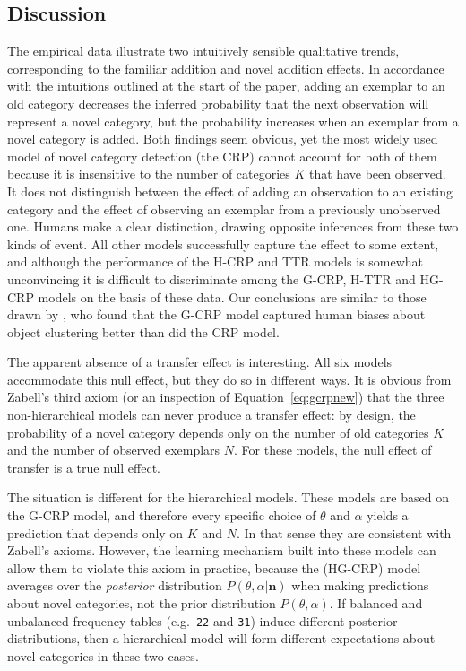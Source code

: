 \documentclass[doc]{apa6}
\newcommand{\dist}[1]{\texttt{#1}}
\begin{document}
\subsection{Discussion}

The empirical data illustrate two intuitively sensible qualitative trends, corresponding to the familiar addition and novel addition effects. In accordance with the intuitions outlined at the start of the paper, adding an exemplar to an old category decreases the inferred probability that the next observation will represent a novel category, but the probability increases when an exemplar from a novel category is added. Both findings seem obvious, yet the most widely used model of novel category detection (the CRP) cannot account for both of them because it is insensitive to the number of categories $K$ that have been observed. It does not distinguish between the effect of adding an observation to an existing category and the effect of observing an exemplar from a previously unobserved one. Humans make a clear distinction, drawing opposite inferences from these two kinds of event. All other models successfully capture the effect to some extent, and although the performance of the H-CRP and TTR models is somewhat unconvincing it is difficult to discriminate among the G-CRP, H-TTR and HG-CRP models on the basis of these data. Our conclusions are similar to those drawn by , who found that the G-CRP model captured human biases about object clustering better than did the CRP model.

The apparent absence of a transfer effect is interesting. All six models accommodate this null effect, but they do so in different ways. It is obvious from Zabell's third axiom (or an inspection of Equation~\ref{eq:gcrpnew}) that the three non-hierarchical models can never produce a transfer effect: by design, the probability of a novel category depends only on the number of old categories $K$ and the number of observed exemplars $N$. For these models, the null effect of transfer is a true null effect.

The situation is different for the hierarchical models. These models are based on the G-CRP model, and therefore every specific choice of $\theta$ and $\alpha$ yields a prediction that depends only on $K$ and $N$. In that sense they are consistent with Zabell's axioms. However, the learning mechanism built into these models can allow them to violate this axiom in practice, because the (HG-CRP) model averages over the {\it posterior} distribution $P(\theta,\alpha | \bm{n})$ when making predictions about novel categories, not the prior distribution $P(\theta,\alpha)$. If balanced and unbalanced frequency tables (e.g.\ \dist{22} and \dist{31}) induce different posterior distributions, then a hierarchical model will form different expectations about novel categories in these two cases.
\end{document}
